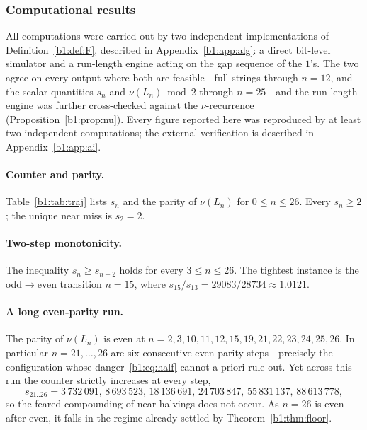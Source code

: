 \documentclass[a4paper]{article}
\theoremstyle{plain}
\theoremstyle{definition}
\theoremstyle{remark}
\begin{document}
\subsubsection{Computational results}\label{b1:sec:comp}
All computations were carried out by two independent implementations of Definition~\ref{b1:def:F}, described in Appendix~\ref{b1:app:alg}: a direct bit-level simulator and a run-length engine acting on the gap sequence of the $1$'s. The two agree on every output where both are feasible---full strings through $n=12$, and the scalar quantities $s_n$ and $\nu(L_n)\bmod 2$ through $n=25$---and the run-length engine was further cross-checked against the $\nu$-recurrence (Proposition~\ref{b1:prop:nu}). Every figure reported here was reproduced by at least two independent computations; the external verification is described in Appendix~\ref{b1:app:ai}.

\paragraph{Counter and parity.} Table~\ref{b1:tab:traj} lists $s_n$ and the parity of $\nu(L_n)$ for $0\le n\le 26$. Every $s_n\ge 2$; the unique near miss is $s_2=2$.

\paragraph{Two-step monotonicity.} The inequality $s_n\ge s_{n-2}$ holds for every $3\le n\le 26$. The tightest instance is the odd$\to$even transition $n=15$, where $s_{15}/s_{13}=29083/28734\approx 1.0121$.

\paragraph{A long even-parity run.} The parity of $\nu(L_n)$ is even at $n=2,3,10,11,12,15,19,21,22,23,24,25,26$. In particular $n=21,\dots,26$ are six consecutive even-parity steps---precisely the configuration whose danger~\eqref{b1:eq:half} cannot a priori rule out. Yet across this run the counter strictly increases at every step,
\[ s_{21..26}=3\,732\,091,\,8\,693\,523,\,18\,136\,691,\,24\,703\,847,\,55\,831\,137,\,88\,613\,778, \]
so the feared compounding of near-halvings does not occur. As $n=26$ is even-after-even, it falls in the regime already settled by Theorem~\ref{b1:thm:floor}.
\end{document}
